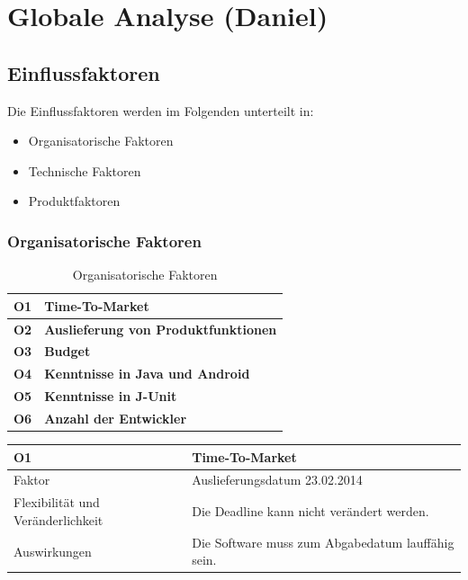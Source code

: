 \documentclass[fontsize=12pt,paper=a4,twoside]{scrartcl}
\begin{document}
\section{Globale Analyse (Daniel)}
\label{sec:globale_analyse}

\subsection{Einflussfaktoren}
\label{sec:einflussfaktoren}

Die Einflussfaktoren werden im Folgenden unterteilt in:

\begin{itemize}
\item{Organisatorische Faktoren}
\item{Technische Faktoren}
\item{Produktfaktoren}
\end{itemize}

\subsubsection{Organisatorische Faktoren}
\label{sec:orgfaktoren}

\begin{table}[H]
\centering
\caption{Organisatorische Faktoren}
\begin{tabular}{|l|l|} \hline
\textbf{O1} & \textbf{Time-To-Market} \\ \hline
\textbf{O2} & \textbf{Auslieferung von Produktfunktionen} \\ \hline
\textbf{O3} & \textbf{Budget} \\ \hline
\textbf{O4} & \textbf{Kenntnisse in Java und Android} \\ \hline
\textbf{O5} & \textbf{Kenntnisse in J-Unit} \\ \hline
\textbf{O6} & \textbf{Anzahl der Entwickler}\\ \hline
\end{tabular}
\end{table}

\begin{table}[H]
\begin{tabular}{|p{3cm}|p{12cm}|}\hline
\textbf{O1} & \textbf{Time-To-Market}\\ \hline \hline
Faktor & Auslieferungsdatum 23.02.2014\\ \hline
Flexibilität und Veränderlichkeit & Die Deadline kann nicht verändert werden.\\ \hline
Auswirkungen & Die Software muss zum Abgabedatum lauffähig sein.\\ \hline
\end{tabular}
\end{table}
\end{document}

